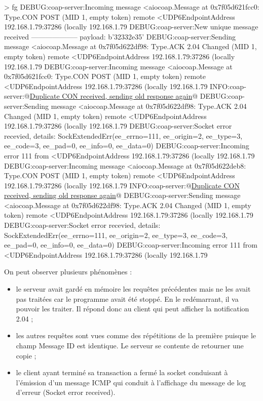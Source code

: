 \begin{termc}[backgroundcolor=\color{palerod}, basicstyle=\ttfamily\tiny, escapechar=@] 
> fg
DEBUG:coap-server:Incoming message <aiocoap.Message at 0x7f05d621fcc0: Type.CON POST (MID 1, empty token) remote 
<UDP6EndpointAddress 192.168.1.79:37286 (locally 192.168.1.79%
DEBUG:coap-server:New unique message received
--------------------
payload: b'32332e35'
DEBUG:coap-server:Sending message <aiocoap.Message at 0x7f05d622df98: Type.ACK 2.04 Changed (MID 1, empty token) 
remote <UDP6EndpointAddress 192.168.1.79:37286 (locally 192.168.1.79%
DEBUG:coap-server:Incoming message <aiocoap.Message at 0x7f05d621fcc0: Type.CON POST (MID 1, empty token) remote 
<UDP6EndpointAddress 192.168.1.79:37286 (locally 192.168.1.79%
INFO:coap-server:@\ul{Duplicate CON received, sending old response again}@
DEBUG:coap-server:Sending message <aiocoap.Message at 0x7f05d622df98: Type.ACK 2.04 Changed (MID 1, empty token) 
remote <UDP6EndpointAddress 192.168.1.79:37286 (locally 192.168.1.79%
DEBUG:coap-server:Socket error recevied, details: SockExtendedErr(ee_errno=111, ee_origin=2, ee_type=3, ee_code=3, 
ee_pad=0, ee_info=0, ee_data=0)
DEBUG:coap-server:Incoming error 111 from <UDP6EndpointAddress 192.168.1.79:37286 (locally 192.168.1.79%
DEBUG:coap-server:Incoming message <aiocoap.Message at 0x7f05d622deb8: Type.CON POST (MID 1, empty token) remote 
<UDP6EndpointAddress 192.168.1.79:37286 (locally 192.168.1.79%
INFO:coap-server:@\ul{Duplicate CON received, sending old response again}@
DEBUG:coap-server:Sending message <aiocoap.Message at 0x7f05d622df98: Type.ACK 2.04 Changed (MID 1, empty token) 
remote <UDP6EndpointAddress 192.168.1.79:37286 (locally 192.168.1.79%
DEBUG:coap-server:Socket error recevied, details: SockExtendedErr(ee_errno=111, ee_origin=2, ee_type=3, ee_code=3, 
ee_pad=0, ee_info=0, ee_data=0)
DEBUG:coap-server:Incoming error 111 from <UDP6EndpointAddress 192.168.1.79:37286 (locally 192.168.1.79%
\end{termc}

On peut observer plusieurs phénomènes :

\begin{itemize}
    \item le serveur avait gardé en mémoire les requêtes précédentes mais ne les avait pas traitées car le programme avait été stoppé. En le redémarrant, il va pouvoir les traiter. Il répond donc au client qui peut afficher la notification 2.04 ;
    \item les autres requêtes sont vues comme des répétitions de la première puisque le champ Message ID est identique. Le serveur se contente de retourner une copie ;
    \item le client ayant terminé sa transaction a fermé la socket conduisant à l'émission d'un message ICMP qui conduit à l'affichage du message de log d'erreur (Socket error received). 
\end{itemize}

